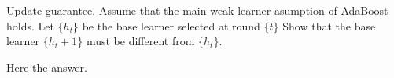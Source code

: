 \documentclass[12pt,letterpaper,boxed]{hmcpset}
\begin{document}
\begin{problem}[Problem 6.3]
Update guarantee. Assume that the main weak learner asumption of AdaBoost holds. Let $\{h_t\}$ be the base learner selected at round $\{t\}$ Show that the base learner $\{h_t+1\}$ must be different from $\{h_t\}$.
\end{problem}

\begin{solution}
Here the answer.
\end{solution}
\end{document}
